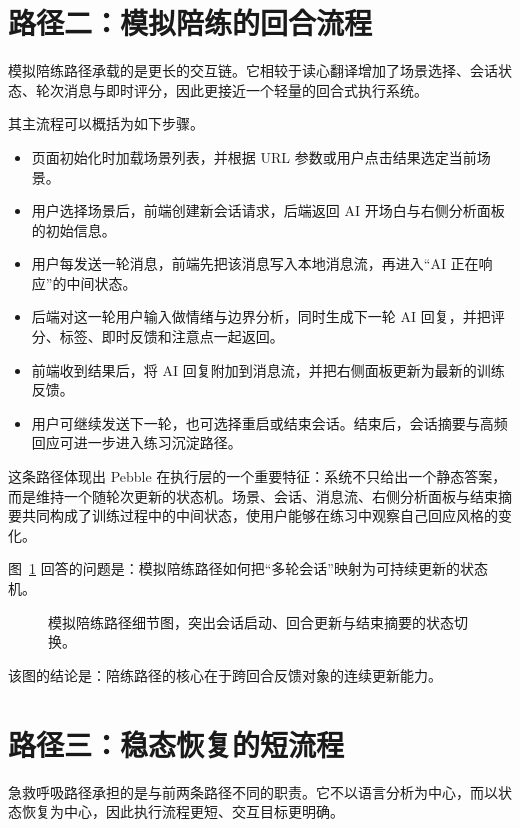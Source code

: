 \section{路径二：模拟陪练的回合流程}

模拟陪练路径承载的是更长的交互链。它相较于读心翻译增加了场景选择、会话状态、轮次消息与即时评分，因此更接近一个轻量的回合式执行系统。

其主流程可以概括为如下步骤。

\begin{itemize}
  \item 页面初始化时加载场景列表，并根据 URL 参数或用户点击结果选定当前场景。
  \item 用户选择场景后，前端创建新会话请求，后端返回 AI 开场白与右侧分析面板的初始信息。
  \item 用户每发送一轮消息，前端先把该消息写入本地消息流，再进入“AI 正在响应”的中间状态。
  \item 后端对这一轮用户输入做情绪与边界分析，同时生成下一轮 AI 回复，并把评分、标签、即时反馈和注意点一起返回。
  \item 前端收到结果后，将 AI 回复附加到消息流，并把右侧面板更新为最新的训练反馈。
  \item 用户可继续发送下一轮，也可选择重启或结束会话。结束后，会话摘要与高频回应可进一步进入练习沉淀路径。
\end{itemize}

这条路径体现出 Pebble 在执行层的一个重要特征：系统不只给出一个静态答案，而是维持一个随轮次更新的状态机。场景、会话、消息流、右侧分析面板与结束摘要共同构成了训练过程中的中间状态，使用户能够在练习中观察自己回应风格的变化。

图~\ref{fig:pebble-dojo-path-detail} 回答的问题是：模拟陪练路径如何把“多轮会话”映射为可持续更新的状态机。

\begin{figure}[H]
  \centering
  
  \caption{模拟陪练路径细节图，突出会话启动、回合更新与结束摘要的状态切换。}
  \label{fig:pebble-dojo-path-detail}
\end{figure}

该图的结论是：陪练路径的核心在于跨回合反馈对象的连续更新能力。

\section{路径三：稳态恢复的短流程}

急救呼吸路径承担的是与前两条路径不同的职责。它不以语言分析为中心，而以状态恢复为中心，因此执行流程更短、交互目标更明确。

